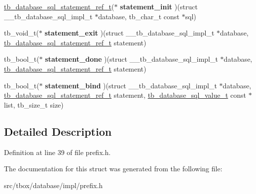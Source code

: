 \begin{DoxyCompactItemize}
\item 
\hypertarget{structtb__database__sql__impl__t_aaf66e4cb699d4d9ddc159a69835959b0}{\hyperlink{structtb__database__sql__statement__ref__t}{tb\-\_\-database\-\_\-sql\-\_\-statement\-\_\-ref\-\_\-t}($\ast$ {\bfseries statement\-\_\-init} )(struct \-\_\-\-\_\-tb\-\_\-database\-\_\-sql\-\_\-impl\-\_\-t $\ast$database, tb\-\_\-char\-\_\-t const $\ast$sql)}\label{structtb__database__sql__impl__t_aaf66e4cb699d4d9ddc159a69835959b0}

\item 
\hypertarget{structtb__database__sql__impl__t_a13e03bd3bbdfbddb32157b4561c55d2b}{tb\-\_\-void\-\_\-t($\ast$ {\bfseries statement\-\_\-exit} )(struct \-\_\-\-\_\-tb\-\_\-database\-\_\-sql\-\_\-impl\-\_\-t $\ast$database, \hyperlink{structtb__database__sql__statement__ref__t}{tb\-\_\-database\-\_\-sql\-\_\-statement\-\_\-ref\-\_\-t} statement)}\label{structtb__database__sql__impl__t_a13e03bd3bbdfbddb32157b4561c55d2b}

\item 
\hypertarget{structtb__database__sql__impl__t_a3d30bdbd0dfaed1887c3ef04c0ed83fd}{tb\-\_\-bool\-\_\-t($\ast$ {\bfseries statement\-\_\-done} )(struct \-\_\-\-\_\-tb\-\_\-database\-\_\-sql\-\_\-impl\-\_\-t $\ast$database, \hyperlink{structtb__database__sql__statement__ref__t}{tb\-\_\-database\-\_\-sql\-\_\-statement\-\_\-ref\-\_\-t} statement)}\label{structtb__database__sql__impl__t_a3d30bdbd0dfaed1887c3ef04c0ed83fd}

\item 
\hypertarget{structtb__database__sql__impl__t_aabf8e4495f0181b6b56c5ace3956bc00}{tb\-\_\-bool\-\_\-t($\ast$ {\bfseries statement\-\_\-bind} )(struct \-\_\-\-\_\-tb\-\_\-database\-\_\-sql\-\_\-impl\-\_\-t $\ast$database, \hyperlink{structtb__database__sql__statement__ref__t}{tb\-\_\-database\-\_\-sql\-\_\-statement\-\_\-ref\-\_\-t} statement, \hyperlink{structtb__database__sql__value__t}{tb\-\_\-database\-\_\-sql\-\_\-value\-\_\-t} const $\ast$list, tb\-\_\-size\-\_\-t size)}\label{structtb__database__sql__impl__t_aabf8e4495f0181b6b56c5ace3956bc00}

\end{DoxyCompactItemize}


\subsection{Detailed Description}


Definition at line 39 of file prefix.\-h.



The documentation for this struct was generated from the following file\-:\begin{DoxyCompactItemize}
\item 
src/tbox/database/impl/prefix.\-h\end{DoxyCompactItemize}

